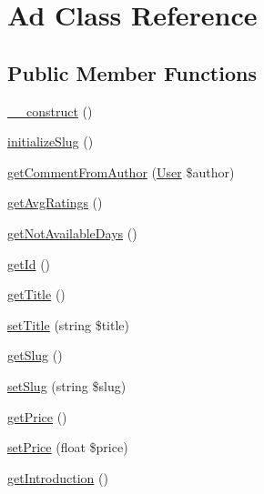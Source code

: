 \hypertarget{class_app_1_1_entity_1_1_ad}{}\section{Ad Class Reference}
\label{class_app_1_1_entity_1_1_ad}
\subsection*{Public Member Functions}
\begin{DoxyCompactItemize}
\item 
\mbox{\hyperlink{class_app_1_1_entity_1_1_ad_a095c5d389db211932136b53f25f39685}{\+\_\+\+\_\+construct}} ()
\item 
\mbox{\hyperlink{class_app_1_1_entity_1_1_ad_a858ff58013625b0534f869b0ce771d29}{initialize\+Slug}} ()
\item 
\mbox{\hyperlink{class_app_1_1_entity_1_1_ad_a6d4d0d9397a52554927e969a43c5d097}{get\+Comment\+From\+Author}} (\mbox{\hyperlink{class_app_1_1_entity_1_1_user}{User}} \$author)
\item 
\mbox{\hyperlink{class_app_1_1_entity_1_1_ad_ae637255703d5beebe63af566c3e7d15e}{get\+Avg\+Ratings}} ()
\item 
\mbox{\hyperlink{class_app_1_1_entity_1_1_ad_abad30aac01e3b8a49980acac5d05f05c}{get\+Not\+Available\+Days}} ()
\item 
\mbox{\hyperlink{class_app_1_1_entity_1_1_ad_a12251d0c022e9e21c137a105ff683f13}{get\+Id}} ()
\item 
\mbox{\hyperlink{class_app_1_1_entity_1_1_ad_a95e859a4588a39a1824b717378a84c29}{get\+Title}} ()
\item 
\mbox{\hyperlink{class_app_1_1_entity_1_1_ad_a754ef3032cc3ffb25ad2d1a13720fc29}{set\+Title}} (string \$title)
\item 
\mbox{\hyperlink{class_app_1_1_entity_1_1_ad_aba91cb698fc762d9fc0975c9f73ae9c4}{get\+Slug}} ()
\item 
\mbox{\hyperlink{class_app_1_1_entity_1_1_ad_a80553db2cd69e4c5c48c124c95385012}{set\+Slug}} (string \$slug)
\item 
\mbox{\hyperlink{class_app_1_1_entity_1_1_ad_a38146d2beb1dd6dfd0f2a5886e18a538}{get\+Price}} ()
\item 
\mbox{\hyperlink{class_app_1_1_entity_1_1_ad_a48d3688b6264543ff1017e3fe06ae7ca}{set\+Price}} (float \$price)
\item 
\mbox{\hyperlink{class_app_1_1_entity_1_1_ad_a35d5a57a94ec7eac2f80749ad8e256bd}{get\+Introduction}} ()
\item 

\end{DoxyCompactItemize}
